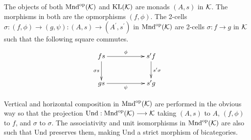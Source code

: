 \documentclass[a4paper,10pt]{article}
\newcommand{\bk}{{\cal{K}}}
\numberwithin{equation}{section}
\begin{document}
The objects of both $\mathrm{Mnd}^{\mathrm{op}}(\bk)$ and $\mathrm{KL}(\bk)$ are monads $(A,s)$ in $\bk$. 
The morphisms in both are the opmorphisms $(f, \phi)$. 
The 2-cells $\sigma : (f, \phi)\longrightarrow (g, \psi) : (A,s) \longrightarrow (A^{\prime},s^{\prime})$ 
in  $\mathrm{Mnd}^{\mathrm{op}}(\bk)$ are 2-cells $\sigma : f \longrightarrow g$ in $\bk$ 
such that the following square commutes.  
\begin{equation}
\xymatrix{
fs \ar[rr]^-{\phi} \ar[d]_-{\sigma s} && s^{\prime}f \ar[d]^-{s^{\prime} \sigma} \\
gs \ar[rr]_-{\psi} && s^{\prime}g}
\end{equation}

\noindent Vertical and horizontal composition in $\mathrm{Mnd}^{\mathrm{op}}(\bk)$ 
are performed in the obvious way so that the projection 
$\mathrm{Und} : \mathrm{Mnd}^{\mathrm{op}}(\bk) \longrightarrow \bk$ 
taking $(A,s)$ to $A$, $(f,\phi)$ to $f$, and $\sigma$ to $\sigma$. 
The associativity and unit isomorphisms in $\mathrm{Mnd}^{\mathrm{op}}(\bk)$ 
are also such that $\mathrm{Und}$ preserves them, making 
$\mathrm{Und}$ a strict morphism of bicategories.
\end{document}
